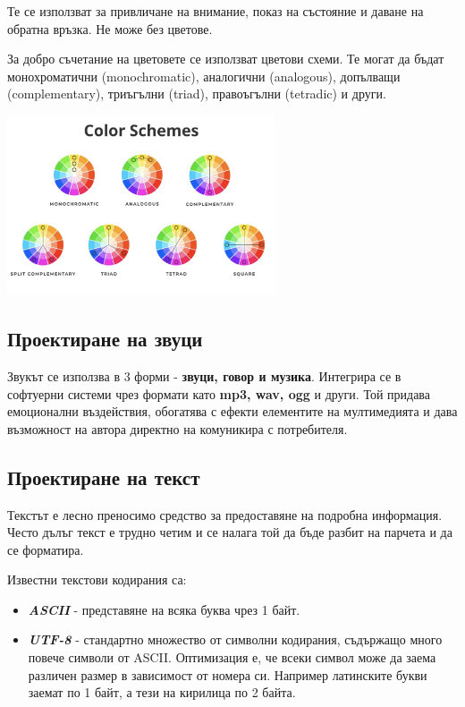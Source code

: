 \documentclass[fleqn,12pt]{article}
\begin{document}
Те се използват за привличане на внимание, показ на състояние и даване на обратна връзка.
Не може без цветове.
\bigbreak

За добро съчетание на цветовете се използват цветови схеми.
Те могат да бъдат монохроматични (monochromatic), аналогични (analogous), допълващи (complementary), триъгълни (triad), правоъгълни (tetradic) и други.

\begin{center} \includegraphics[width=300px]{color_schemes.png} \end{center}

\subsection{Проектиране на звуци}

Звукът се използва в 3 форми - \textbf{звуци, говор и музика}.
Интегрира се в софтуерни системи чрез формати като \textbf{mp3, wav, ogg} и други.
Той придава емоционални въздействия, обогатява с ефекти елементите на мултимедията и дава възможност на автора директно на комуникира с потребителя.

\subsection{Проектиране на текст}

Текстът е лесно преносимо средство за предоставяне на подробна информация.
Често дълъг текст е трудно четим и се налага той да бъде разбит на парчета и да се форматира.
\bigbreak

Известни текстови кодирания са:
\begin{itemize}
    \item \textbf{\textit{ASCII}} - представяне на всяка буква чрез 1 байт.
    \item \textbf{\textit{UTF-8}} - стандартно множество от символни кодирания, съдържащо много повече символи от ASCII.
    Оптимизация е, че всеки символ може да заема различен размер в зависимост от номера си.
    Например латинските букви заемат по 1 байт, а тези на кирилица по 2 байта.
\end{itemize}
\end{document}
